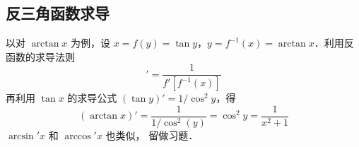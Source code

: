 \subsection{反三角函数求导}
以对 $\arctan x$ 为例，设 $x=f(y)=\tan y$，$y=f^{-1}(x)=\arctan x$．利用反函数的求导法则
\begin{equation}
[f^{-1} (x)]' = \frac{1}{f'[f^{ - 1}(x)]}
\end{equation} 
再利用 $\tan x$ 的求导公式 $(\tan y)'=1/\cos^2 y$，得
\begin{equation}
(\arctan x)'=\frac{1}{1/\cos^2 (y)}=\cos^2 y=\frac{1}{x^2+1}
\end{equation}
$\arcsin' x$ 和 $\arccos' x$ 也类似， 留做习题．
